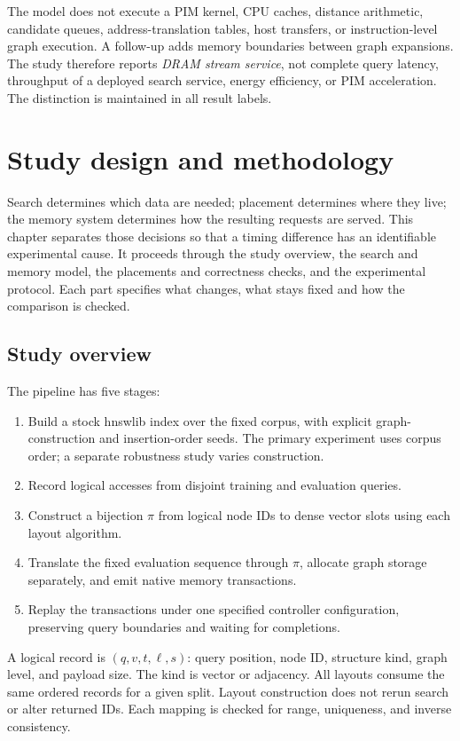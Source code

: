 \documentclass[11pt,a4paper]{report}
\begin{document}
The model does not execute a PIM kernel, CPU caches, distance arithmetic, candidate queues, address-translation tables, host transfers, or instruction-level graph execution. A follow-up adds memory boundaries between graph expansions. The study therefore reports \emph{DRAM stream service}, not complete query latency, throughput of a deployed search service, energy efficiency, or PIM acceleration. The distinction is maintained in all result labels.

\chapter{Study design and methodology}
\label{ch:model}
Search determines which data are needed; placement determines where they live; the memory system determines how the resulting requests are served. This chapter separates those decisions so that a timing difference has an identifiable experimental cause. It proceeds through the study overview, the search and memory model, the placements and correctness checks, and the experimental protocol. Each part specifies what changes, what stays fixed and how the comparison is checked.
\section{Study overview}
The pipeline has five stages:
\begin{enumerate}
\item Build a stock hnswlib index over the fixed corpus, with explicit graph-construction and insertion-order seeds. The primary experiment uses corpus order; a separate robustness study varies construction.
\item Record logical accesses from disjoint training and evaluation queries.
\item Construct a bijection $\pi$ from logical node IDs to dense vector slots using each layout algorithm.
\item Translate the fixed evaluation sequence through $\pi$, allocate graph storage separately, and emit native memory transactions.
\item Replay the transactions under one specified controller configuration, preserving query boundaries and waiting for completions.
\end{enumerate}

A logical record is $(q,v,t,\ell,s)$: query position, node ID, structure kind, graph level, and payload size. The kind is vector or adjacency. All layouts consume the same ordered records for a given split. Layout construction does not rerun search or alter returned IDs. Each mapping is checked for range, uniqueness, and inverse consistency.
\end{document}
